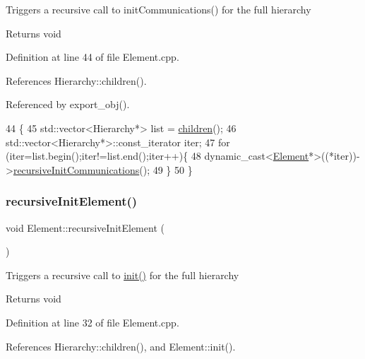 Triggers a recursive call to init\+Communications() for the full hierarchy

\begin{DoxyReturn}{Returns}
void 
\end{DoxyReturn}


Definition at line 44 of file Element.\+cpp.



References Hierarchy\+::children().



Referenced by export\+\_\+obj().


\begin{DoxyCode}
44                                          \{
45   std::vector<Hierarchy*> list = \hyperlink{classHierarchy_aa9a76f69e98e052ee1a6e32cea006288}{children}();
46   std::vector<Hierarchy*>::const\_iterator iter;
47   \textcolor{keywordflow}{for} (iter=list.begin();iter!=list.end();iter++)\{
48     \textcolor{keyword}{dynamic\_cast<}\hyperlink{classElement}{Element}*\textcolor{keyword}{>}((*iter))->\hyperlink{classElement_a82119ed37dff76508a2746a853ec35ba}{recursiveInitCommunications}();
49   \}
50 \}
\end{DoxyCode}
\mbox{\label{classElement_a3c0abcb36f8906688bb7e32608df7086}} 
\subsubsection{\texorpdfstring{recursive\+Init\+Element()}{recursiveInitElement()}}
{\footnotesize\ttfamily void Element\+::recursive\+Init\+Element (\begin{DoxyParamCaption}{ }\end{DoxyParamCaption})\hspace{0.3cm}{\ttfamily [inherited]}}

Triggers a recursive call to \hyperlink{classUsbSpiBus_a38203aaf0806b9a1c7cc0686831a7ce9}{init()} for the full hierarchy

\begin{DoxyReturn}{Returns}
void 
\end{DoxyReturn}


Definition at line 32 of file Element.\+cpp.



References Hierarchy\+::children(), and Element\+::init().



